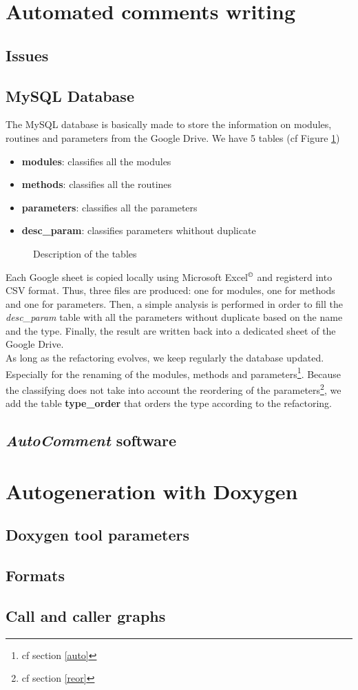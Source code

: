 \section{Automated comments writing}
\subsection{Issues}
\subsection{MySQL Database}

The MySQL database is basically made to store the information on modules, routines and parameters from the Google Drive. We have 5 tables (cf Figure \ref{table})
\begin{itemize}
\item \textbf{modules}: classifies all the modules
\item \textbf{methods}: classifies all the routines
\item \textbf{parameters}: classifies all the parameters
\item \textbf{desc\_param}: classifies parameters whithout duplicate
\end{itemize}
\begin{figure}
\caption{Description of the tables\label{table}}
\end{figure}
Each Google sheet is copied locally using Microsoft Excel$^\copyright$ and registerd into CSV format. Thus, three files are produced: one for modules, one for methods and one for parameters. Then, a simple analysis is performed in order to fill the \textit{desc\_param} table with all the parameters without duplicate based on the name and the type. Finally, the result are written back into a dedicated sheet of the Google Drive.\\

As long as the refactoring evolves, we keep regularly the database updated. Especially for the renaming of the modules, methods and parameters\footnote{cf section \ref{auto}}. Because the classifying does not take into account the reordering of the parameters\footnote{cf section \ref{reor}}, we add the table \textbf{type\_order} that orders the type according to the refactoring.
\subsection{\textit{AutoComment} software\label{auto}}
\section{Autogeneration with Doxygen}
\subsection{Doxygen tool parameters}
\subsection{Formats}
\subsection{Call and caller graphs}
